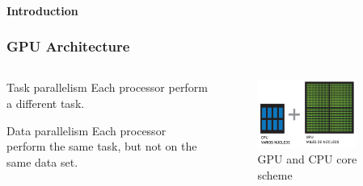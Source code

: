 \begin{frame}
    \framesubtitle{Introduction}
    \frametitle{GPU Architecture}

    \begin{columns}
        \begin{column}{0.5\textwidth}
            \begin{block}{Task parallelism}
                Each processor perform a different task.
            \end{block}
            \begin{block}{Data parallelism}
                Each processor perform the same task, but not on the same data set.
            \end{block}
        \end{column}
        \begin{column}{0.5\textwidth}
             \begin{figure}
                 \centering
                 \includegraphics[width=0.8\textwidth]{img/cpu_gpu}
                 \caption{GPU and CPU core scheme}
                 \label{fig:titan}
             \end{figure}
        \end{column}
    \end{columns}
\end{frame}

